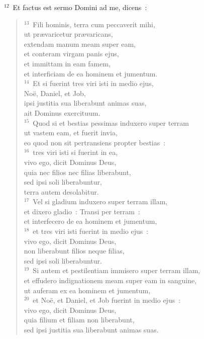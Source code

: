 ${}^{12}$~Et factus est sermo Domini ad me, dicens~:
\begin{verse}${}^{13}$~Fili hominis, terra cum peccaverit mihi,\\ ut pr\ae varicetur pr\ae varicans,\\ extendam manum meam super eam,\\ et conteram virgam panis ejus,\\ et immittam in eam famem,\\ et interficiam de ea hominem et jumentum.\\
${}^{14}$~Et si fuerint tres viri isti in medio ejus,\\ No\"e, Daniel, et Job,\\ ipsi justitia sua liberabunt animas suas,\\ ait Dominus exercituum.\\
${}^{15}$~Quod si et bestias pessimas induxero super terram\\ ut vastem eam, et fuerit invia,\\ eo quod non sit pertransiens propter bestias~:\\
${}^{16}$~tres viri isti si fuerint in ea,\\ vivo ego, dicit Dominus Deus,\\ quia nec filios nec filias liberabunt,\\ sed ipsi soli liberabuntur,\\ terra autem desolabitur.\\
${}^{17}$~Vel si gladium induxero super terram illam,\\ et dixero gladio~: Transi per terram~:\\ et interfecero de ea hominem et jumentum,\\
${}^{18}$~et tres viri isti fuerint in medio ejus~:\\ vivo ego, dicit Dominus Deus,\\ non liberabunt filios neque filias,\\ sed ipsi soli liberabuntur.\\
${}^{19}$~Si autem et pestilentiam immisero super terram illam,\\ et effudero indignationem meam super eam in sanguine,\\ ut auferam ex ea hominem et jumentum,\\
${}^{20}$~et No\"e, et Daniel, et Job fuerint in medio ejus~:\\ vivo ego, dicit Dominus Deus,\\ quia filium et filiam non liberabunt,\\ sed ipsi justitia sua liberabunt animas suas.\\

\end{verse}
